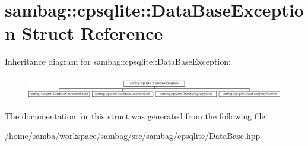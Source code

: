 \hypertarget{structsambag_1_1cpsqlite_1_1_data_base_exception}{
\section{sambag::cpsqlite::DataBaseException Struct Reference}
\label{structsambag_1_1cpsqlite_1_1_data_base_exception}
}
Inheritance diagram for sambag::cpsqlite::DataBaseException:\begin{figure}[H]
\begin{center}
\leavevmode
\includegraphics[height=1.037037cm]{structsambag_1_1cpsqlite_1_1_data_base_exception}
\end{center}
\end{figure}


The documentation for this struct was generated from the following file:\begin{DoxyCompactItemize}
\item 
/home/samba/workspace/sambag/src/sambag/cpsqlite/DataBase.hpp\end{DoxyCompactItemize}
